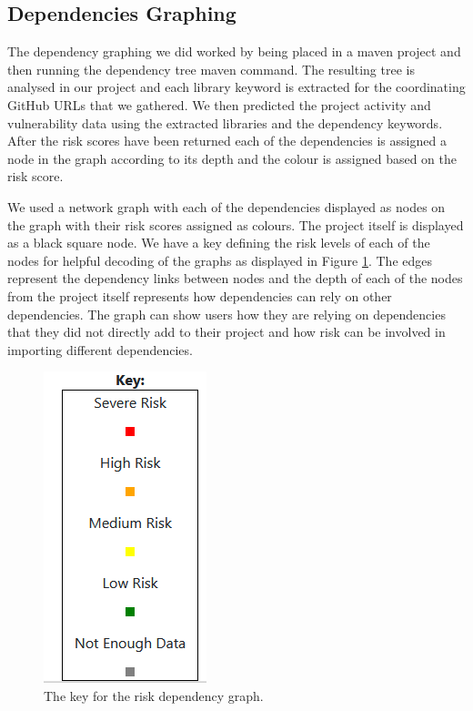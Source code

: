 \documentclass[10pt, compsoc, conference]{IEEEtran}
\begin{document}
\subsection{Dependencies Graphing}
The dependency graphing we did worked by being placed in a maven project and then running the dependency tree maven command. The resulting tree is analysed in our project and each library keyword is extracted for the coordinating GitHub URLs that we gathered. We then predicted the project activity and vulnerability data using the extracted libraries and the dependency keywords. After the risk scores have been returned each of the dependencies is assigned a node in the graph according to its depth and the colour is assigned based on the risk score.

We used a network graph with each of the dependencies displayed as nodes on the graph with their risk scores assigned as colours. The project itself is displayed as a black square node. We have a key defining the risk levels of each of the nodes for helpful decoding of the graphs as displayed in Figure \ref{fig:key}. The edges represent the dependency links between nodes and the depth of each of the nodes from the project itself represents how dependencies can rely on other dependencies. The graph can show users how they are relying on dependencies that they did not directly add to their project and how risk can be involved in importing different dependencies. 

\begin{figure}
    \centering
    \includegraphics[scale=0.5]{Key.png}
    \caption{The key for the risk dependency graph.}
    \label{fig:key}
\end{figure}
\end{document}
